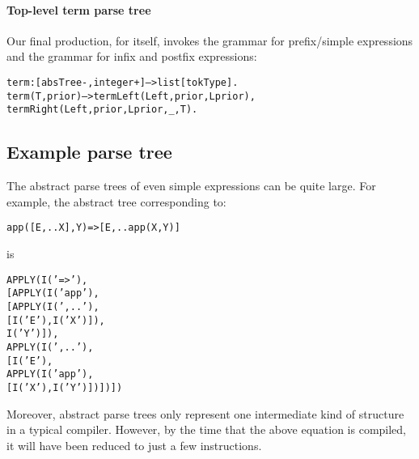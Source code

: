 \paragraph{Top-level term parse tree}       
Our final production, for  itself, invokes the grammar for prefix/simple expressions and the grammar for infix and postfix expressions:
\begin{alltt}
term:[absTree-,integer+]-->list[tokType].
term(T,prior) --> termLeft(Left,prior,Lprior),
    termRight(Left,prior,Lprior,_,T).
\end{alltt}


\subsection{Example parse tree}
The abstract parse trees of even simple expressions can be quite large. For example, the abstract tree corresponding to:

\begin{alltt}
app([E,..X],Y) => [E,..app(X,Y)]
\end{alltt}
is
\begin{alltt}
APPLY(I('=>'),
      [APPLY(I('app'),
             [APPLY(I(',..'),
                    [I('E'),I('X')]),
              I('Y')]),
       APPLY(I(',..'),
             [I('E'),
              APPLY(I('app'),
                    [I('X'),I('Y')])])])
\end{alltt}
Moreover, abstract parse trees only represent one intermediate kind of structure in a typical \go compiler. However, by the time that the above equation is compiled, it will have been reduced to just a few instructions.

